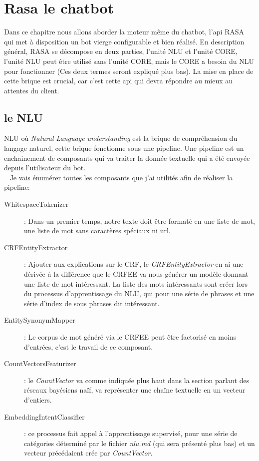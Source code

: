 \chapter{Rasa le chatbot}

Dans ce chapitre nous allons aborder la moteur même du chatbot, l'api RASA qui met à disposition un bot vierge configurable et bien réalisé. \linebreak
En description général, RASA se décompose en deux parties, l'unité NLU et l'unité CORE, l'unité NLU peut être utilisé sans l'unité CORE, mais le CORE a besoin du NLU pour fonctionner (Ces deux termes seront expliqué plus bas).
La mise en place de cette brique est crucial, car c'est cette api qui devra répondre au mieux au attentes du client.

\pagebreak
\section{le NLU}
NLU où \textit{Natural Language understanding} est la brique de compréhension du langage naturel, cette brique fonctionne sous une pipeline. Une pipeline est un enchainement de composants qui va traiter la donnée textuelle qui a été envoyée depuis l'utilisateur du bot.\\
\ \linebreak
Je vais énumérer toutes les composants que j'ai utilités afin de réaliser la pipeline:
\begin{description}
\item[WhitespaceTokenizer]: Dans un premier temps, notre texte doit être formaté en une liste de mot, une liste de mot sans caractères spéciaux ni url.
\item[CRFEntityExtractor]: Ajouter aux explications sur le CRF, le \textit{CRFEntityExtractor} en ai une dérivée à la différence que le CRFEE va nous générer un modèle donnant une liste de mot intéressant. La liste des mots intéressants sont créer lors du processus d'apprentissage du NLU, qui pour une série de phrases et une série d'index de sous phrases dit intéressant.
\item[EntitySynonymMapper]: Le corpus de mot généré via le CRFEE peut être factorisé en moins d'entrées, c'est le travail de ce composant.
\item[CountVectorsFeaturizer]: le \textit{CountVector} va comme indiquée plus haut dans la section parlant des réseaux bayésiens naïf, va représenter une chaîne textuelle en un vecteur d'entiers.
\item[EmbeddingIntentClassifier]: ce processus fait appel à l'apprentissage supervisé, pour une série de catégories déterminé par le fichier \textit{nlu.md} (qui sera présenté plus bas) et un vecteur précédaient crée par \textit{CountVector}.
\end{description}

